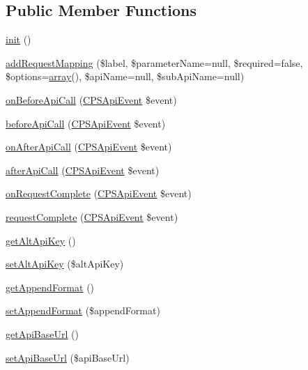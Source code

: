 \subsection*{Public Member Functions}
\begin{DoxyCompactItemize}
\item 
\hyperlink{classCPSApiComponent_a4be4055f3361d4800e16bc2e2e38cda6}{init} ()
\item 
\hyperlink{classCPSApiComponent_a72f783743d37a2e103180fd56a6725b4}{addRequestMapping} (\$label, \$parameterName=null, \$required=false, \$options=\hyperlink{list_8php_aa3205d038c7f8feb5c9f01ac4dfadc88}{array}(), \$apiName=null, \$subApiName=null)
\item 
\hyperlink{classCPSApiComponent_a557a9b057d808b200135c94fca584e0e}{onBeforeApiCall} (\hyperlink{classCPSApiEvent}{CPSApiEvent} \$event)
\item 
\hyperlink{classCPSApiComponent_a26ff9d20e512abb2fd2c9061113ef18e}{beforeApiCall} (\hyperlink{classCPSApiEvent}{CPSApiEvent} \$event)
\item 
\hyperlink{classCPSApiComponent_a78645643d5dbedc1f2d94cf4444972ff}{onAfterApiCall} (\hyperlink{classCPSApiEvent}{CPSApiEvent} \$event)
\item 
\hyperlink{classCPSApiComponent_aa933e612b3f1107782c7aee9e64cfd52}{afterApiCall} (\hyperlink{classCPSApiEvent}{CPSApiEvent} \$event)
\item 
\hyperlink{classCPSApiComponent_a2ad6936786c03a9799b272b89fbf0cd5}{onRequestComplete} (\hyperlink{classCPSApiEvent}{CPSApiEvent} \$event)
\item 
\hyperlink{classCPSApiComponent_ab6ee484d39c103c7992bfd1fc50e5574}{requestComplete} (\hyperlink{classCPSApiEvent}{CPSApiEvent} \$event)
\item 
\hyperlink{classCPSApiComponent_ac2748791f3cfd9fc147d995920b01181}{getAltApiKey} ()
\item 
\hyperlink{classCPSApiComponent_a305ec5588b0b6a3cb7af1028a5b9a7b1}{setAltApiKey} (\$altApiKey)
\item 
\hyperlink{classCPSApiComponent_a06a40fc56ede1a897eba4f1813339d09}{getAppendFormat} ()
\item 
\hyperlink{classCPSApiComponent_aec22119763ba4fab08836f25fbbf0cdb}{setAppendFormat} (\$appendFormat)
\item 
\hyperlink{classCPSApiComponent_a4d08db742849f4840f97ddf93bece54c}{getApiBaseUrl} ()
\item 
\hyperlink{classCPSApiComponent_a5cd04e298df50da7d6a99d97121808eb}{setApiBaseUrl} (\$apiBaseUrl)

\end{DoxyCompactItemize}
